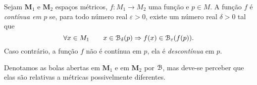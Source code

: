 \begin{defi}
Sejam $\bm M_1$ e $\bm M_2$ espaços métricos, $f: M_1 \to M_2$ uma função e $p \in M$. A função $f$ é \emph{contínua em $p$} se, para todo número real $\varepsilon > 0$, existe um número real $\delta > 0$ tal que
	\begin{equation*}
	\forall x \in M_1 \qquad x \in \mathcal{B}_\delta(p) \Rightarrow f(x) \in \mathcal{B}_\varepsilon(f(p)).
	\end{equation*}
Caso contrário, a função $f$ não é contínua em $p$, ela é \emph{descontínua} em $p$.
\end{defi}

Denotamos as bolas abertas em $\bm M_1$ e em $\bm M_2$ por $\mathcal{B}$, mas deve-se perceber que elas são relativas a métricas possivelmente diferentes. 

